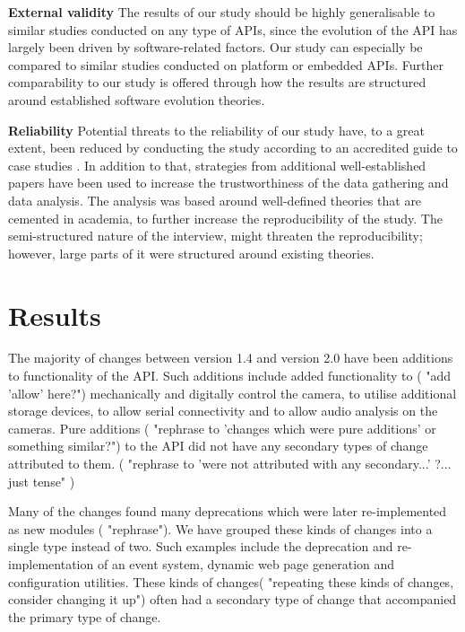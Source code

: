 \documentclass{sig-alternate}
\begin{document}
\smallskip \noindent
\textbf{External validity  } The results of our study should be highly generalisable to similar studies conducted on any type of APIs, since the evolution of the API has largely been driven by software-related factors. Our study can especially be compared to similar studies conducted on platform or embedded APIs. Further comparability to our study is offered through how the results are structured around established software evolution theories. 

\smallskip \noindent
\textbf{Reliability  } Potential threats to the reliability of our study have, to a great extent, been reduced by conducting the study according to an accredited guide to case studies \cite{runeson2009guidelines}. In addition to that, strategies from additional well-established papers \cite{andersson2007spiral, seaman1999qualitative, robson2002real} have been used to increase the trustworthiness of the data gathering and data analysis. The analysis was based around well-defined theories that are cemented in academia, to further increase the reproducibility of the study. The semi-structured nature of the interview, might threaten the reproducibility; however, large parts of it were structured around existing theories. 




\section{Results} \label{results} 

The majority of changes between version 1.4 and version 2.0 have been additions to functionality of the API. Such additions include added functionality to ( "add 'allow' here?") mechanically and digitally control the camera, to utilise additional storage devices, to allow serial connectivity and to allow audio analysis on the cameras. Pure additions ( "rephrase to 'changes which were pure additions' or something similar?") to the API did not have any secondary types of change attributed to them. ( "rephrase to 'were not attributed with any secondary...' ?... just tense" )

Many of the changes found many deprecations which were later re-implemented as new modules ( "rephrase"). We have grouped these kinds of changes into a single type instead of two. Such examples include the deprecation and re-implementation of an event system, dynamic web page generation and configuration utilities. These kinds of changes( "repeating these kinds of changes, consider changing it up") often had a secondary type of change that accompanied the primary type of change.
\end{document}
